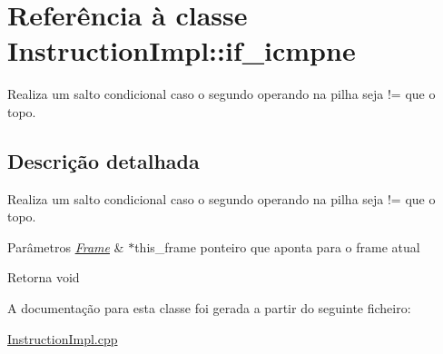 \hypertarget{class_instruction_impl_1_1if__icmpne}{}\section{Referência à classe Instruction\+Impl\+:\+:if\+\_\+icmpne}
\label{class_instruction_impl_1_1if__icmpne}


Realiza um salto condicional caso o segundo operando na pilha seja != que o topo.  




\subsection{Descrição detalhada}
Realiza um salto condicional caso o segundo operando na pilha seja != que o topo. 


\begin{DoxyParams}{Parâmetros}
{\em \hyperlink{struct_frame}{Frame}} & $\ast$this\+\_\+frame ponteiro que aponta para o frame atual \\
\hline
\end{DoxyParams}
\begin{DoxyReturn}{Retorna}
void 
\end{DoxyReturn}


A documentação para esta classe foi gerada a partir do seguinte ficheiro\+:\begin{DoxyCompactItemize}
\item 
\hyperlink{_instruction_impl_8cpp}{Instruction\+Impl.\+cpp}\end{DoxyCompactItemize}
